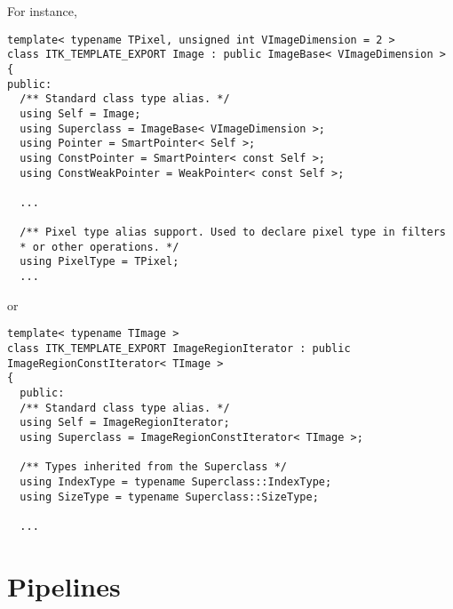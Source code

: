For instance,

\small
\begin{verbatim}
template< typename TPixel, unsigned int VImageDimension = 2 >
class ITK_TEMPLATE_EXPORT Image : public ImageBase< VImageDimension >
{
public:
  /** Standard class type alias. */
  using Self = Image;
  using Superclass = ImageBase< VImageDimension >;
  using Pointer = SmartPointer< Self >;
  using ConstPointer = SmartPointer< const Self >;
  using ConstWeakPointer = WeakPointer< const Self >;

  ...

  /** Pixel type alias support. Used to declare pixel type in filters
  * or other operations. */
  using PixelType = TPixel;
  ...
\end{verbatim}
\normalsize

or

\small
\begin{verbatim}
template< typename TImage >
class ITK_TEMPLATE_EXPORT ImageRegionIterator : public ImageRegionConstIterator< TImage >
{
  public:
  /** Standard class type alias. */
  using Self = ImageRegionIterator;
  using Superclass = ImageRegionConstIterator< TImage >;

  /** Types inherited from the Superclass */
  using IndexType = typename Superclass::IndexType;
  using SizeType = typename Superclass::SizeType;

  ...
\end{verbatim}
\normalsize


\section{Pipelines}
\label{sec:Pipelines}

